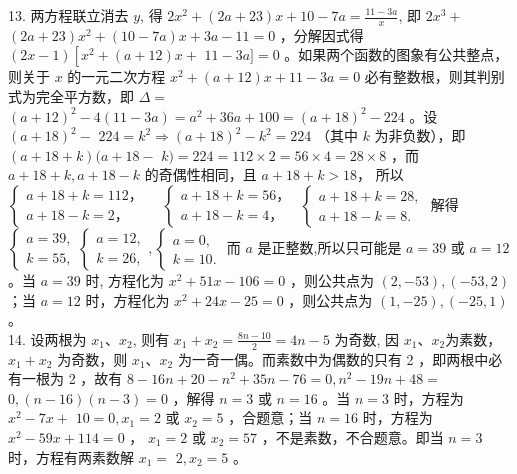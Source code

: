 \documentclass[10pt]{article}
\begin{document}
13. 两方程联立消去 $y$, 得 $2 x^{2}+(2 a+23) x+10-7 a=\frac{11-3 a}{x}$, 即 $2 x^{3}+$ $(2 a+23) x^{2}+(10-7 a) x+3 a-11=0$ ，分解因式得 $(2 x-1)\left[x^{2}+(a+12) x+\right.$ $11-3 a]=0$ 。如果两个函数的图象有公共整点，则关于 $x$ 的一元二次方程 $x^{2}+(a+12) x+11-3 a=0$ 必有整数根，则其判别式为完全平方数，即 $\Delta=$ $(a+12)^{2}-4(11-3 a)=a^{2}+36 a+100=(a+18)^{2}-224$ 。设 $(a+18)^{2}-$ $224=k^{2} \Rightarrow(a+18)^{2}-k^{2}=224$ （其中 $k$ 为非负数），即 $(a+18+k)(a+18-$ $k)=224=112 \times 2=56 \times 4=28 \times 8$ ，而 $a+18+k, a+18-k$ 的奇偶性相同，且 $a+18+k>18 ，$ 所以 $\left\{\begin{array}{l}a+18+k=112 ， \\ a+18-k=2 ，\end{array} \quad\left\{\begin{array}{l}a+18+k=56 ， \\ a+18-k=4 ，\end{array}\right.\right.$ $\left\{\begin{array}{l}a+18+k=28, \\ a+18-k=8 .\end{array}\right.$ 解得 $\left\{\begin{array}{l}a=39, \\ k=55,\end{array}\left\{\begin{array}{l}a=12, \\ k=26,\end{array},\left\{\begin{array}{l}a=0, \\ k=10 .\end{array}\right.\right.\right.$ 而 $a$ 是正整数,所以只可能是 $a=39$ 或 $a=12$ 。当 $a=39$ 时, 方程化为 $x^{2}+51 x-106=0$ ，则公共点为 $(2,-53),(-53,2)$ ；当 $a=12$ 时，方程化为 $x^{2}+24 x-25=0$ ，则公共点为 $(1,-25),(-25,1)$ 。\\
14. 设两根为 $x_{1} 、 x_{2}$, 则有 $x_{1}+x_{2}=\frac{8 n-10}{2}=4 n-5$ 为奇数, 因 $x_{1} 、 x_{2}$为素数， $x_{1}+x_{2}$ 为奇数，则 $x_{1} 、 x_{2}$ 为一奇一偶。而素数中为偶数的只有 2 ，即两根中必有一根为 2 ，故有 $8-16 n+20-n^{2}+35 n-76=0, n^{2}-19 n+48=$ $0,(n-16)(n-3)=0$ ，解得 $n=3$ 或 $n=16$ 。当 $n=3$ 时，方程为 $x^{2}-7 x+$ $10=0, x_{1}=2$ 或 $x_{2}=5$ ，合题意；当 $n=16$ 时，方程为 $x^{2}-59 x+114=0$ ， $x_{1}=2$ 或 $x_{2}=57$ ，不是素数，不合题意。即当 $n=3$ 时，方程有两素数解 $x_{1}=$ $2, x_{2}=5$ 。\\
\end{document}

